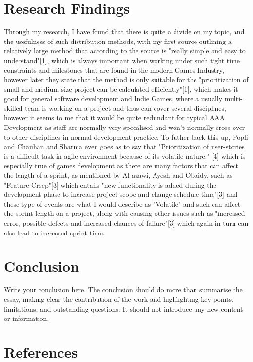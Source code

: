 \documentclass{scrartcl}
\begin{document}
\section{Research Findings}

Through my research, I have found that there is quite a divide on my topic, and the usefulness of such distribution methods, with my first source outlining a relatively large method that according to the source is "really simple and easy to understand"[1], which is always important when working under such tight time constraints and milestones that are found in the modern Games Industry, however later they state that the method is only suitable for the "prioritization of small and medium size project can be calculated efficiently"[1], which makes it good for general software development and Indie Games, where a usually multi-skilled team is working on a project and thus can cover several disciplines, however it seems to me that it would be quite redundant for typical AAA Development as staff are normally very specalised and won't normally cross over to other disciplines in normal development practice. To futher back this up, Popli and Chauhan and Sharma even goes as to say that "Prioritization of user-stories is a difficult task in agile environment because of its volatile nature." [4] which is especially true of games development as there are many factors that can affect the length of a sprint, as mentioned by Al-azawi, Ayesh and Obaidy, such as "Feature Creep"[3] which entails "new functionality is added during the development phase to increase project scope and change schedule time"[3] and these type of events are what I would describe as "Volatile" and such can affect the sprint length on a project, along with causing other issues such as "increased error, possible defects and increased chances of failure"[3] which again in turn can also lead to increased sprint time. 

\section{Conclusion}

Write your conclusion here. The conclusion should do more than summarise the essay, making clear the contribution of the work and highlighting key points, limitations, and outstanding questions. It should not introduce any new content or information.

\section{References}
\end{document}
